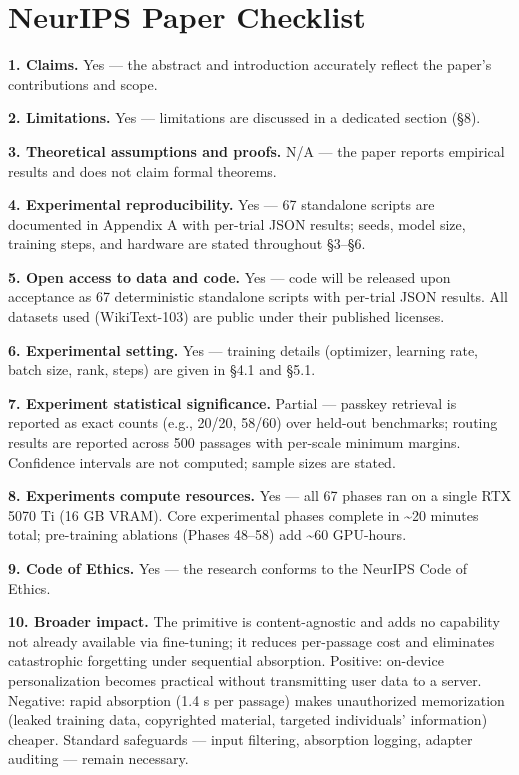 \section{NeurIPS Paper Checklist}\label{neurips-paper-checklist}

\textbf{1. Claims.} Yes --- the abstract and introduction accurately reflect the paper's contributions and scope.

\textbf{2. Limitations.} Yes --- limitations are discussed in a dedicated section (\S 8).

\textbf{3. Theoretical assumptions and proofs.} N/A --- the paper reports empirical results and does not claim formal theorems.

\textbf{4. Experimental reproducibility.} Yes --- 67 standalone scripts are documented in Appendix A with per-trial JSON results; seeds, model size, training steps, and hardware are stated throughout \S 3--\S 6.

\textbf{5. Open access to data and code.} Yes --- code will be released upon acceptance as 67 deterministic standalone scripts with per-trial JSON results. All datasets used (WikiText-103) are public under their published licenses.

\textbf{6. Experimental setting.} Yes --- training details (optimizer, learning rate, batch size, rank, steps) are given in \S 4.1 and \S 5.1.

\textbf{7. Experiment statistical significance.} Partial --- passkey retrieval is reported as exact counts (e.g., 20/20, 58/60) over held-out benchmarks; routing results are reported across 500 passages with per-scale minimum margins. Confidence intervals are not computed; sample sizes are stated.

\textbf{8. Experiments compute resources.} Yes --- all 67 phases ran on a single RTX 5070 Ti (16 GB VRAM). Core experimental phases complete in \textasciitilde20 minutes total; pre-training ablations (Phases 48--58) add \textasciitilde60 GPU-hours.

\textbf{9. Code of Ethics.} Yes --- the research conforms to the NeurIPS Code of Ethics.

\textbf{10. Broader impact.} The primitive is content-agnostic and adds no capability not already available via fine-tuning; it reduces per-passage cost and eliminates catastrophic forgetting under sequential absorption. Positive: on-device personalization becomes practical without transmitting user data to a server. Negative: rapid absorption (1.4 s per passage) makes unauthorized memorization (leaked training data, copyrighted material, targeted individuals' information) cheaper. Standard safeguards --- input filtering, absorption logging, adapter auditing --- remain necessary.

